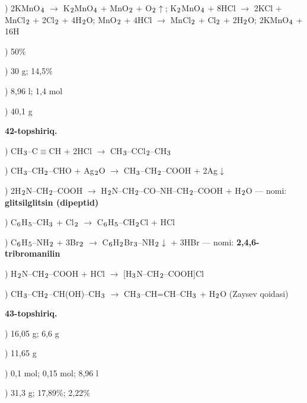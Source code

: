 \documentclass[11pt,a4paper]{article}
\renewcommand{\textsubscript}[1]{\ensuremath{_{\text{\fontsize{8}{8}\selectfont #1}}}}
\begin{document}
) 2KMnO\textsubscript{4} $\to$ K\textsubscript{2}MnO\textsubscript{4} + MnO\textsubscript{2} + O\textsubscript{2}$\uparrow$; K\textsubscript{2}MnO\textsubscript{4} + 8HCl $\to$ 2KCl + MnCl\textsubscript{2} + 2Cl\textsubscript{2} + 4H\textsubscript{2}O; MnO\textsubscript{2} + 4HCl $\to$ MnCl\textsubscript{2} + Cl\textsubscript{2} + 2H\textsubscript{2}O; 2KMnO\textsubscript{4} + 16H\par
{}) 50\%\par
{}) 30 g; 14,5\%\par
{}) 8,96 l; 1,4 mol\par
{}) 40,1 g\par
\noindent\textbf{42-topshiriq.}\par
{}) CH\textsubscript{3}--C$\equiv$CH + 2HCl $\to$ CH\textsubscript{3}--CCl\textsubscript{2}--CH\textsubscript{3}\par
{}) CH\textsubscript{3}--CH\textsubscript{2}--CHO + Ag\textsubscript{2}O $\to$ CH\textsubscript{3}--CH\textsubscript{2}--COOH + 2Ag$\downarrow$\par
{}) 2H\textsubscript{2}N--CH\textsubscript{2}--COOH $\to$ H\textsubscript{2}N--CH\textsubscript{2}--CO--NH--CH\textsubscript{2}--COOH + H\textsubscript{2}O --- nomi: \textbf{glitsilglitsin (dipeptid)}\par
{}) C\textsubscript{6}H\textsubscript{5}--CH\textsubscript{3} + Cl\textsubscript{2} $\to$ C\textsubscript{6}H\textsubscript{5}--CH\textsubscript{2}Cl + HCl\par
{}) C\textsubscript{6}H\textsubscript{5}--NH\textsubscript{2} + 3Br\textsubscript{2} $\to$ C\textsubscript{6}H\textsubscript{2}Br\textsubscript{3}--NH\textsubscript{2}$\downarrow$ + 3HBr --- nomi: \textbf{2,4,6-tribromanilin}\par
{}) H\textsubscript{2}N--CH\textsubscript{2}--COOH + HCl $\to$ [H\textsubscript{3}N--CH\textsubscript{2}--COOH]Cl\par
{}) CH\textsubscript{3}--CH\textsubscript{2}--CH(OH)--CH\textsubscript{3} $\to$ CH\textsubscript{3}--CH=CH--CH\textsubscript{3} + H\textsubscript{2}O (Zaysev qoidasi)\par
\noindent\textbf{43-topshiriq.}\par
{}) 16,05 g; 6,6 g\par
{}) 11,65 g\par
{}) 0,1 mol; 0,15 mol; 8,96 l\par
{}) 31,3 g; 17,89\%; 2,22\%\par
\end{document}
